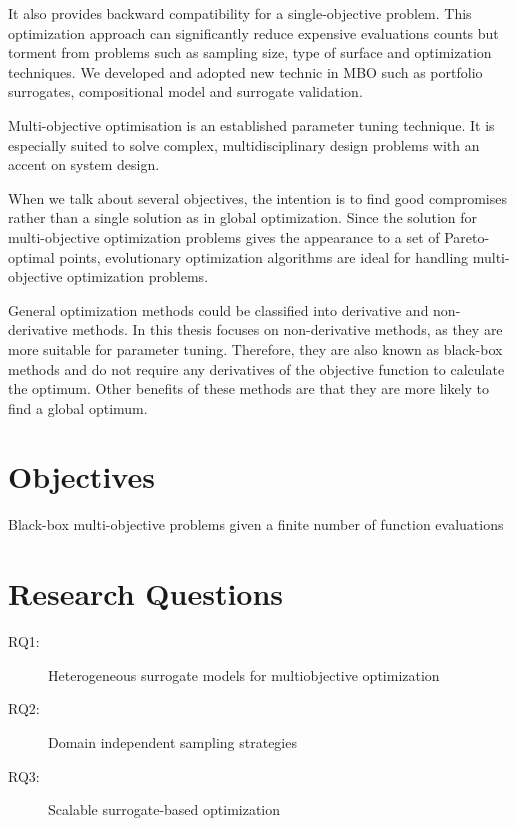     It also provides backward compatibility for a single-objective problem. This optimization approach can significantly reduce expensive evaluations counts but torment from problems such as sampling size, type of surface and optimization techniques. We developed and adopted new technic in MBO such as portfolio surrogates, compositional model and surrogate validation. 

    Multi-objective optimisation is an established parameter tuning technique. It is especially suited to solve complex, multidisciplinary design problems with an accent on system design.

    When we talk about several objectives, the intention is to find good compromises rather than a single solution as in global optimization.
    Since the solution for multi-objective optimization problems gives the appearance to a set of Pareto-optimal points, evolutionary optimization algorithms are ideal for handling multi-objective optimization problems.

    General optimization methods could be classified into derivative and non-derivative methods. In this thesis focuses on non-derivative methods, as they are more suitable for parameter tuning. Therefore, they are also known as black-box methods and do not require any derivatives of the objective function to calculate the optimum.  Other benefits of these methods are that they are more likely to find a global optimum. 


\section{Objectives}
    Black-box multi-objective problems given a finite number of function evaluations

\section{Research Questions}


\begin{description}
    \item[RQ1:\label{RQ1}] Heterogeneous surrogate models for multiobjective optimization
    \item[RQ2:\label{RQ2}] Domain independent sampling strategies
    \item[RQ3:\label{RQ3}] Scalable surrogate-based optimization 
\end{description}

